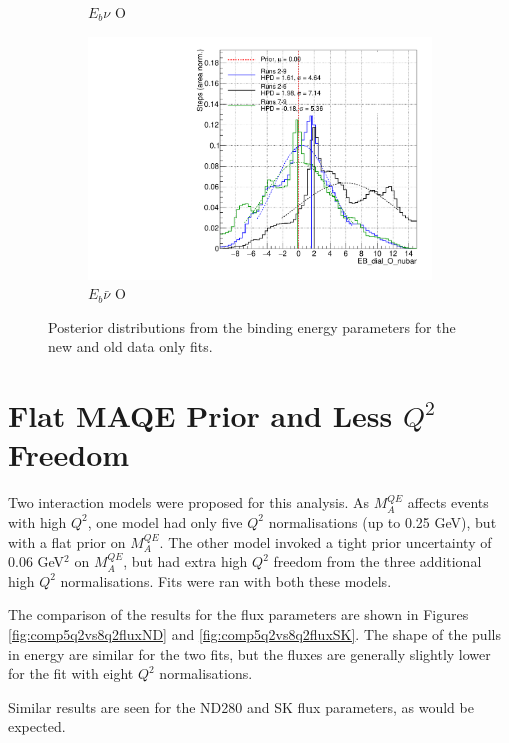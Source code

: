 \begin{figure}
\begin{subfigure}{.48\textwidth}
  \caption{$E_{b}\nu$ O}
\end{subfigure}
\begin{subfigure}{.48\textwidth}
  \centering
  \includegraphics[width=0.73\linewidth]{figs/Runs_EB_dial_O_nubar}
  \caption{$E_{b}\bar{\nu}$ O}
\end{subfigure}
\caption{Posterior distributions from the binding energy parameters for the new and old data only fits.}
\label{fig:RunsEbdata}
\end{figure}

\section{Flat MAQE Prior and Less $Q^2$ Freedom}

Two interaction models were proposed for this analysis. As $M_{A}^{QE}$ affects events with high $Q^{2}$, one model had only five $Q^2$ normalisations (up to 0.25 GeV), but with a flat prior on $M_{A}^{QE}$. The other model invoked a tight prior uncertainty of 0.06 GeV$^2$ on $M_{A}^{QE}$, but had extra high $Q^2$ freedom from the three additional high $Q^2$ normalisations. Fits were ran with both these models.

The comparison of the results for the flux parameters are shown in Figures \ref{fig:comp5q2vs8q2fluxND} and \ref{fig:comp5q2vs8q2fluxSK}. The shape of the pulls in energy are similar for the two fits, but the fluxes are generally slightly lower for the fit with eight $Q^2$ normalisations.

Similar results are seen for the ND280 and SK flux parameters, as would be expected.

